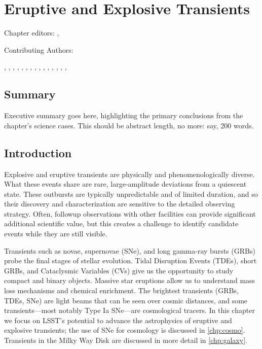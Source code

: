 
\chapter[Transients]{Eruptive and Explosive Transients}
\def\chpname{transients}\label{chp:\chpname}

Chapter editors:
,

Contributing Authors:

,
,
,
,
,
,
,
,
,
,
,
,
,
,
,

\section*{Summary}

Executive summary goes here, highlighting the primary conclusions from
the chapter's science cases. This should be abstract length, no more:
say, 200 words.


\section{Introduction}


Explosive and eruptive transients are physically and
phenomenologically diverse.   What these events share
are rare, large-amplitude deviations from a quiescent state.  These
outbursts are typically unpredictable and of limited duration, and so their
discovery and characterization are sensitive to the detailed observing
strategy.  Often, followup observations with other facilities can provide
significant additional scientific value, but this creates a challenge to
identify candidate events while they are still visible.

Transients such as novae, supernovae (SNe), and long gamma-ray bursts (GRBs)
probe the final stages of stellar evolution. Tidal Disruption Events
(TDEs), short GRBs, and
Cataclysmic Variables (CVs) give us the opportunity to study
compact and binary objects. Massive star eruptions allow us to understand
mass loss mechanisms and chemical enrichment.
The brightest transients (GRBs, TDEs,
SNe) are light beams that can be seen over cosmic distances, and some
transients---most notably Type Ia SNe---are cosmological tracers.
In this chapter we focus on LSST's potential to advance the astrophysics of
eruptive and explosive transients; the use of SNe for cosmology is
discussed in \autoref{chp:cosmo}. Transients in the Milky Way Disk are
discussed in more detail in \autoref{chp:galaxy}.

